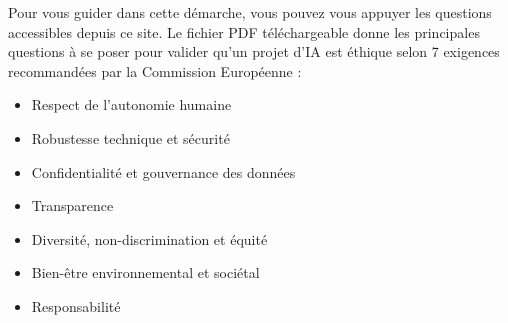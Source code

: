 Pour vous guider dans cette démarche, vous pouvez vous appuyer les questions accessibles depuis ce site. Le fichier PDF téléchargeable donne les principales questions à se poser pour valider qu'un projet d'IA est éthique selon 7 exigences recommandées par la Commission Européenne :

\begin{itemize}
    \item Respect de l'autonomie humaine
    \item Robustesse technique et sécurité
    \item Confidentialité et gouvernance des données
    \item Transparence
    \item Diversité, non-discrimination et équité
    \item Bien-être environnemental et sociétal
    \item Responsabilité
\end{itemize}
